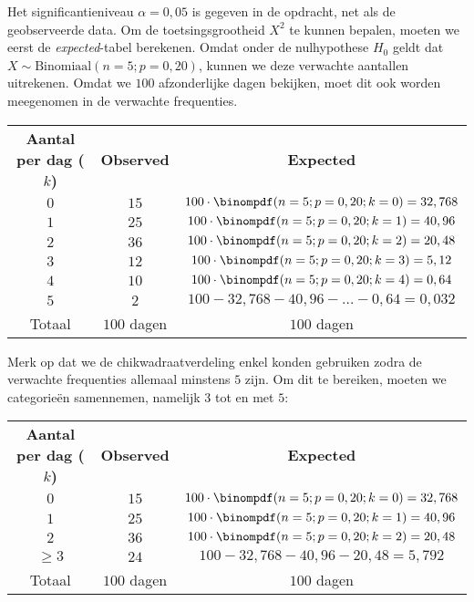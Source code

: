 {    Het significantieniveau $\alpha=0,05$ is gegeven in de opdracht, net als de geobserveerde data.
    Om de toetsingsgrootheid $X^2$ te kunnen bepalen, moeten we eerst de \emph{expected}-tabel berekenen.
    Omdat onder de nulhypothese $H_0$ geldt dat $X \sim \text{Binomiaal}(n=5; p=0,20)$, kunnen we deze verwachte aantallen uitrekenen. 
    Omdat we $100$ afzonderlijke dagen bekijken, moet dit ook worden meegenomen in de verwachte frequenties.   
    \begin{center}
        \renewcommand{\arraystretch}{1.25}
        \begin{tabular}{ccc}
            \toprule
                {\bfseries Aantal per dag ($k$)} & {\bfseries Observed} & {\bfseries Expected} \\
            \cmidrule{1-1} \cmidrule{2-2} \cmidrule{3-3}
                $0$ & $15$ & $100 \cdot \binompdf(n=5; p=0,20; k=0) = 32,768$ \\
                $1$ & $25$ & $100 \cdot \binompdf(n=5; p=0,20; k=1) = 40,96$ \\
                $2$ & $36$ & $100 \cdot \binompdf(n=5; p=0,20; k=2) = 20,48$ \\
                $3$ & $12$ & $100 \cdot \binompdf(n=5; p=0,20; k=3) = 5,12$ \\
                $4$ & $10$ & $100 \cdot \binompdf(n=5; p=0,20; k=4) = 0,64$ \\
                $5$ & $2$  & $100 - 32,768 - 40,96 - \ldots - 0,64 = 0,032$ \\
            \cmidrule{1-1} \cmidrule{2-2} \cmidrule{3-3}
                Totaal & $100$ dagen & $100$ dagen \\
            \bottomrule
        \end{tabular}
    \end{center}
    Merk op dat we de chikwadraatverdeling enkel konden gebruiken zodra de verwachte frequenties allemaal minstens $5$ zijn.
    Om dit te bereiken, moeten we categorie\"en samennemen, namelijk $3$ tot en met $5$:
    \begin{center}
        \renewcommand{\arraystretch}{1.25}
        \begin{tabular}{ccc}
            \toprule
                {\bfseries Aantal per dag ($k$)} & {\bfseries Observed} & {\bfseries Expected} \\
            \cmidrule{1-1} \cmidrule{2-2} \cmidrule{3-3}
                $0$ & $15$ & $100 \cdot \binompdf(n=5; p=0,20; k=0) = 32,768$ \\
                $1$ & $25$ & $100 \cdot \binompdf(n=5; p=0,20; k=1) = 40,96$ \\
                $2$ & $36$ & $100 \cdot \binompdf(n=5; p=0,20; k=2) = 20,48$ \\
                $\ge 3$ & $24$ & $100 - 32,768 - 40,96 - 20,48 = 5,792$ \\
            \cmidrule{1-1} \cmidrule{2-2} \cmidrule{3-3}
                Totaal & $100$ dagen & $100$ dagen \\
            \bottomrule
        \end{tabular}
    \end{center}

}
